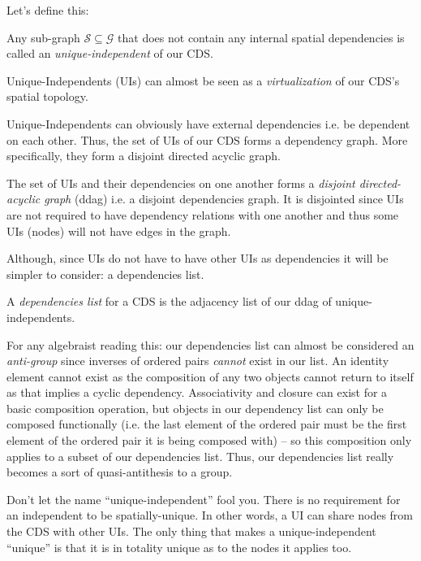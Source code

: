 Let's define this:

\begin{con-def}
	\label{independents}
	Any sub-graph $\mathcal{S} \subseteq \mathcal{G}$ that does not contain any internal spatial dependencies is called an \textit{unique-independent} of our CDS.
\end{con-def}

Unique-Independents (UIs) can almost be seen as a \textit{virtualization} of our CDS's spatial topology.

Unique-Independents can obviously have external dependencies i.e. be dependent on each other. Thus, the set of UIs of our CDS forms a dependency graph. More specifically, they form a disjoint directed acyclic graph.

\begin{con-def}
	\label{ddag}
	The set of UIs and their dependencies on one another forms a \textit{disjoint directed-acyclic graph} (ddag) i.e. a disjoint dependencies graph. It is disjointed since UIs are not required to have dependency relations with one another and thus some UIs (nodes) will not have edges in the graph.
\end{con-def}

Although, since UIs do not have to have other UIs as dependencies it will be simpler to consider: a dependencies list.

\begin{con-def}
	\label{dependency-list}
	A \textit{dependencies list} for a CDS is the adjacency list of our ddag of unique-independents.
\end{con-def}

\if
For any algebraist reading this: our dependencies list can almost be considered an \textit{anti-group} since inverses of ordered pairs \textit{cannot} exist in our list. An identity element cannot exist as the composition of any two objects cannot return to itself as that implies a cyclic dependency. Associativity and closure can exist for a basic composition operation, but objects in our dependency list can only be composed functionally (i.e. the last element of the ordered pair must be the first element of the ordered pair it is being composed with) -- so this composition only applies to a subset of our dependencies list. Thus, our dependencies list really becomes a sort of quasi-antithesis to a group.
\fi

Don't let the name ``unique-independent'' fool you. There is no requirement for an independent to be spatially-unique. In other words, a UI can share nodes from the CDS with other UIs. The only thing that makes a unique-independent ``unique'' is that it is in totality unique as to the nodes it applies too. 

